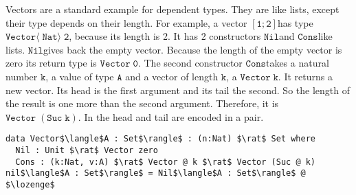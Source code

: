 \documentclass[a4paper,cleardoubleempty,BCOR1cm]{scrbook}
\begin{document}
Vectors are a standard example for dependent types. They are like lists,
except their type depends on their length. For example, a vector $\mathtt{[1;2]}$\;has
type $\mathtt{Vector\langle\;Nat\rangle\;2}$, because its length is 2. It has 2
constructors $\mathtt{Nil}$\;and $\mathtt{Cons}$\;like lists. $\mathtt{Nil}$\;gives back the empty vector.
Because the length of the empty vector is zero its return type is $\mathtt{Vector\;0}$.
The second constructor $\mathtt{Cons}$\;takes a natural number $\mathtt{k}$, a value of type $\mathtt{A}$
and a vector of length $\mathtt{k}$, a $\mathtt{Vector\;k}$. It returns a new vector. Its head
is the first argument and its tail the second. So the length of the result is one
more than the second argument. Therefore, it is $\mathtt{Vector\;(Suc\;k)}$.  In
\cite{basold2016type} the head and tail are encoded in a pair.

\begin{lstlisting}
data Vector$\langle$A : Set$\rangle$ : (n:Nat) $\rat$ Set where
  Nil : Unit $\rat$ Vector zero
  Cons : (k:Nat, v:A) $\rat$ Vector @ k $\rat$ Vector (Suc @ k)
nil$\langle$A : Set$\rangle$ = Nil$\langle$A : Set$\rangle$ @ $\lozenge$
\end{lstlisting}
\end{document}
